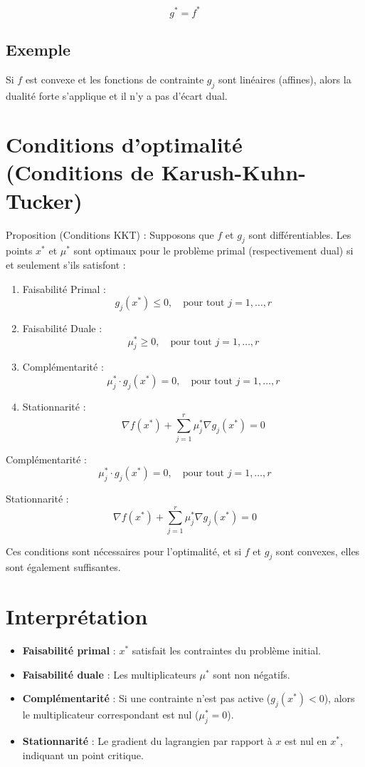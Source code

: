 \documentclass{article}
\begin{document}
\[
g^* = f^*
\]

\subsection{Exemple}

Si $f$ est convexe et les fonctions de contrainte $g_j$ sont linéaires (affines), alors la dualité forte s'applique et il n'y a pas d'écart dual.

\section{Conditions d'optimalité (Conditions de Karush-Kuhn-Tucker)}

Proposition (Conditions KKT) : Supposons que $f$ et $g_j$ sont différentiables. Les points $x^*$ et $\mu^*$ sont optimaux pour le problème primal (respectivement dual) si et seulement s'ils satisfont :

\begin{enumerate}
    \item Faisabilité Primal : 
    \[
    g_j(x^*) \leq 0, \quad \text{pour tout } j = 1, \dotsc, r
    \]
    \item Faisabilité Duale : 
    \[
    \mu_j^* \geq 0, \quad \text{pour tout } j = 1, \dotsc, r
    \]
    \item Complémentarité :
    \[
    \mu_j^* \cdot g_j(x^*) = 0, \quad \text{pour tout } j = 1, \dotsc, r
    \]
    \item Stationnarité : 
    \[
    \nabla f(x^*) + \sum_{j=1}^r \mu_j^* \nabla g_j(x^*) = 0
    \]
\end{enumerate}

\item Complémentarité : 
    \[
    \mu_j^* \cdot g_j(x^*) = 0, \quad \text{pour tout } j = 1, \dotsc, r
    \]
    
\item Stationnarité : 
    \[
    \nabla f(x^*) + \sum_{j=1}^r \mu_j^* \nabla g_j(x^*) = 0
    \]

Ces conditions sont nécessaires pour l'optimalité, et si $f$ et $g_j$ sont convexes, elles sont également suffisantes.

\section{Interprétation}

\begin{itemize}
    \item \textbf{Faisabilité primal} : $x^*$ satisfait les contraintes du problème initial.
    \item \textbf{Faisabilité duale} : Les multiplicateurs $\mu^*$ sont non négatifs.
    \item \textbf{Complémentarité} : Si une contrainte n'est pas active ($g_j(x^*) < 0$), alors le multiplicateur correspondant est nul ($\mu_j^* = 0$).
    \item \textbf{Stationnarité} : Le gradient du lagrangien par rapport à $x$ est nul en $x^*$, indiquant un point critique.
\end{itemize}
\end{document}
